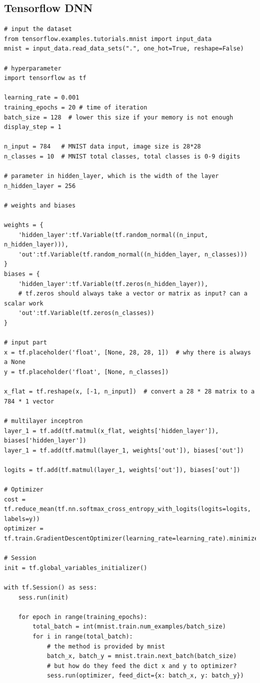 \documentclass{article}
\begin{document}
\subsection{Tensorflow DNN}
\begin{lstlisting}
# input the dataset
from tensorflow.examples.tutorials.mnist import input_data
mnist = input_data.read_data_sets(".", one_hot=True, reshape=False)

# hyperparameter
import tensorflow as tf

learning_rate = 0.001
training_epochs = 20 # time of iteration
batch_size = 128  # lower this size if your memory is not enough
display_step = 1

n_input = 784   # MNIST data input, image size is 28*28
n_classes = 10  # MNIST total classes, total classes is 0-9 digits

# parameter in hidden_layer, which is the width of the layer
n_hidden_layer = 256

# weights and biases

weights = {
	'hidden_layer':tf.Variable(tf.random_normal((n_input, n_hidden_layer))),
	'out':tf.Variable(tf.random_normal((n_hidden_layer, n_classes)))
}
biases = {
	'hidden_layer':tf.Variable(tf.zeros(n_hidden_layer)), 
	# tf.zeros should always take a vector or matrix as input? can a scalar work
	'out':tf.Variable(tf.zeros(n_classes))
}

# input part
x = tf.placeholder('float', [None, 28, 28, 1])  # why there is always a None
y = tf.placeholder('float', [None, n_classes])

x_flat = tf.reshape(x, [-1, n_input])  # convert a 28 * 28 matrix to a 784 * 1 vector

# multilayer inceptron
layer_1 = tf.add(tf.matmul(x_flat, weights['hidden_layer']), biases['hidden_layer'])
layer_1 = tf.add(tf.matmul(layer_1, weights['out']), biases['out'])

logits = tf.add(tf.matmul(layer_1, weights['out']), biases['out'])

# Optimizer
cost = tf.reduce_mean(tf.nn.softmax_cross_entropy_with_logits(logits=logits, labels=y))
optimizer = tf.train.GradientDescentOptimizer(learning_rate=learning_rate).minimize(cost)

# Session
init = tf.global_variables_initializer()

with tf.Session() as sess:
	sess.run(init)
	
	for epoch in range(training_epochs):
		total_batch = int(mnist.train.num_examples/batch_size)
		for i in range(total_batch):
			# the method is provided by mnist
			batch_x, batch_y = mnist.train.next_batch(batch_size)  
			# but how do they feed the dict x and y to optimizer?
			sess.run(optimizer, feed_dict={x: batch_x, y: batch_y})

\end{lstlisting}
\end{document}
